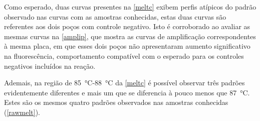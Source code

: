 Como esperado, duas curvas presentes na \cref{meltc} exibem perfis atípicos do
padrão observado nas curvas com as amostras conhecidas, estas duas curvas são
referentes aos dois poços com controle negativo. Isto é corroborado ao avaliar
as mesmas curvas na \cref{amplip}, que mostra as curvas de amplificação
correspondentes à mesma placa, em que esses dois poços não apresentaram aumento
significativo na fluorescência, comportamento compatível com o esperado para os
controles negativos incluídos na reação.

Ademais, na região de \qty{85}{\celsius}-\qty{88}{\celsius} da \cref{meltc} é
possível observar três padrões evidentemente diferentes e mais um que se
diferencia à pouco menos que \qty{87}{\celsius}. Estes são os mesmos quatro
padrões observados nas amostras conhecidas (\cref{rawmelt}).
